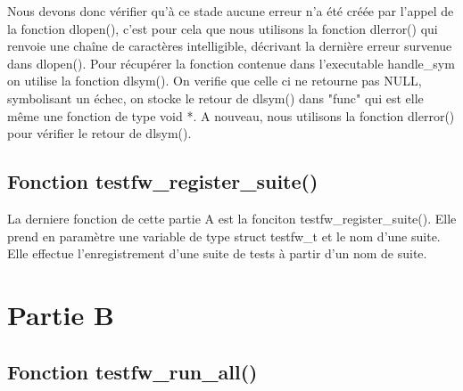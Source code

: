 \documentclass{article}
\begin{document}
Nous devons donc vérifier qu'à ce stade aucune erreur n'a été créée par l'appel de la fonction dlopen(), c'est pour cela que nous utilisons la fonction dlerror() qui renvoie une chaîne de caractères intelligible, décrivant la dernière erreur survenue dans dlopen().  Pour récupérer la fonction contenue dans l'executable  handle\_sym on utilise la fonction dlsym(). On verifie que celle ci ne retourne pas NULL,  symbolisant un échec, on stocke le retour de dlsym() dans "func" qui est elle même une fonction de type void *.  A nouveau, nous utilisons la fonction dlerror() pour vérifier le retour de dlsym().



\subsection{Fonction testfw\_register\_suite()}
 La derniere fonction de cette partie A est la fonciton testfw\_register\_suite().  Elle prend en paramètre 
 une variable de type struct testfw\_t et le nom d'une suite.  Elle effectue l'enregistrement d'une suite de tests à partir d'un nom de suite. 
\section{Partie B}
\subsection{Fonction testfw\_run\_all()}
  
\end{document}
